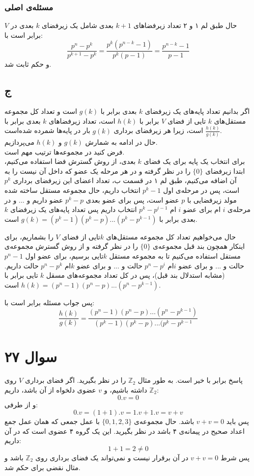\documentclass[12pt,a4paper]{article}
\begin{document}
\subsubsection{مسئله‌ی اصلی}
حال طبق لم ۱ و ۲ تعداد زیرفضاهای 
$k+1$
بعدی شامل یک زیرفضای $k$ بعدی در $V$ برابر است با:
\[
\frac{p^n - p^k}{p^{k+1}-p^k} = \frac{p^k(p^{n-k}- 1)}{p^k(p - 1)} = \frac{p^{n-k}-1}{p - 1}
\]
و حکم ثابت شد.
\subsection{ج}
اگر بدانیم تعداد پایه‌های یک زیرفضای $k$ بعدی برابر با 
$g(k)$
است و تعداد کل مجموعه مستقل‌های $k$ تایی از فضای $V$ برابر با 
$h(k)$
است، تعداد زیرفضاهای $k$ بعدی برابر با 
$\frac{h(k)}{g(k)}$
است، زیرا هر زیرفضای برداری $g(k)$ بار در پایه‌ها شمرده شده‌است.
\\
حال در ادامه به شمارش 
$g(k)$
و
$h(k)$
می‌پردازیم.
\\
فرض کنید در مجموعه‌ها ترتیب مهم است.
\\
برای انتخاب یک پایه برای یک فضای $k$ بعدی، از روش گسترش فضا استفاده می‌کنیم، ابتدا زیرفضای 
$\{0\}$
را در نظر گرفته و در هر مرحله یک عضو که داخل آن نیست را به آن اضافه می‌کنیم، طبق لم ۱ در قسمت ب، تعداد اعضای این زیرفضای برداری 
$p^k$
 است، پس در مرحله‌ی اول 
$p^k-1$
انتخاب داریم، حال مجموعه مستقل ساخته شده مولد زیرفضایی با $p$ عضو است، پس برای عضو بعدی
$p^k-p$
عضو داریم و ... و در مرحله‌ی $i$ ام برای عضو $i$ ام 
$p^k-p^{i-1}$
انتخاب داریم پس تعداد پایه‌های یک زیرفضای $k$ بعدی برابر با
$g(k) = (p^k - 1)(p^k - p)...(p^k - p^{k-1})$
است.

حال می‌خواهیم تعداد کل مجموعه مستقل‌های $k$تایی از فضای $V$ را بشماریم، برای اینکار همچون بند قبل مجموعه‌ی 
$\{0\}$
را در نظر گرفته و از روش گسترش مجموعه‌ی مستقل استفاده می‌کنیم تا به مجموعه مستقل $k$تایی برسیم، برای عضو اول 
$p^n-1$
حالت و ... و برای عضو $i$ام
$p^n - p^i$
حالت و ... و برای عضو $k$ام
$p^n - p^k$
حالت داریم. (مشابه استدلال بند قبل)، پس در کل تعداد مجموعه‌های مسقل $k$ تایی برابر با
$h(k) = (p^n - 1)(p^n - p) ... (p^n - p^{k-1})$
است.

پس جواب مسئله برابر است با:
\[
\frac{h(k)}{g(k)} = \frac{(p^n-1)(p^n-p)...(p^n-p^{k-1})}{(p^k-1)(p^k-p)...(p^k-p^{k-1}}
\]
\section{سوال ۲۷}
پاسخ برابر با خیر است. به طور مثال
$\mathbb{Z}_2$
را در نظر بگیرید. اگر فضای برداری $V$ روی 
$\mathbb{Z}_2$
داشته باشیم، و $v$ عضوی دلخواه از آن باشد، داریم:
\[
0.v = 0
\]
و از طرفی:
\[
0.v = (1+1).v = 1.v + 1.v = v+v
\]
پس باید 
$v+v = 0$
باشد. حال مجموعه‌ی 
$\{0, 1, 2, 3\}$
با عمل جمعی که همان عمل جمع اعداد صحیح در پیمانه‌ی ۴ باشد در نظر بگیرید. این یک گروه ۴ عضوی است که در آن داریم:
\[
1+1 = 2 \neq 0
\] 
پس شرط 
$v+v = 0$
در آن برقرار نیست و نمی‌تواند یک فضای برداری روی 
$\mathbb{Z}_2$
باشد و مثال نقضی برای حکم شد.
\end{document}
